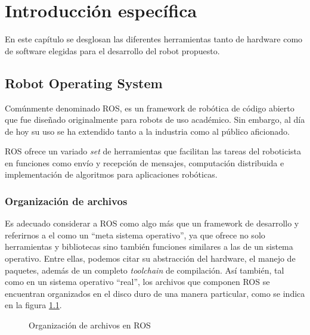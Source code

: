 \chapter{Introducción específica}

\label{Capitulo2}

En este capítulo se desglosan las diferentes herramientas tanto de hardware como de software elegidas para el desarrollo del robot propuesto.

\section{Robot Operating System}

Comúnmente denominado ROS, es un framework de robótica de código abierto que fue diseñado originalmente para robots de uso académico. Sin embargo, al día de hoy su uso se ha extendido tanto a la industria como al público aficionado.

ROS ofrece un variado \textit{set} de herramientas que facilitan las tareas del roboticista en funciones como envío y recepción de mensajes, computación distribuida e implementación de algoritmos para aplicaciones robóticas.

\subsection{Organización de archivos}\label{sec:organizacionArchivos}

Es adecuado considerar a ROS como algo más que un framework de desarrollo y referirnos a el como un ``meta sistema operativo'', ya que ofrece no solo herramientas y bibliotecas sino también funciones similares a las de un sistema operativo. Entre ellas, podemos citar su abstracción del hardware, el manejo de paquetes, además de un completo \textit{toolchain} de compilación. Así también, tal como en un sistema operativo ``real'', los archivos que componen ROS se encuentran organizados en el disco duro de una manera particular, como se indica en la figura \ref{fig:rosSistemaDeArchivos}.

\begin{figure}[ht]
    \centering
    \def\svgwidth{350pt}
    
    \caption{Organización de archivos en ROS}
    \label{fig:rosSistemaDeArchivos}
\end{figure}

